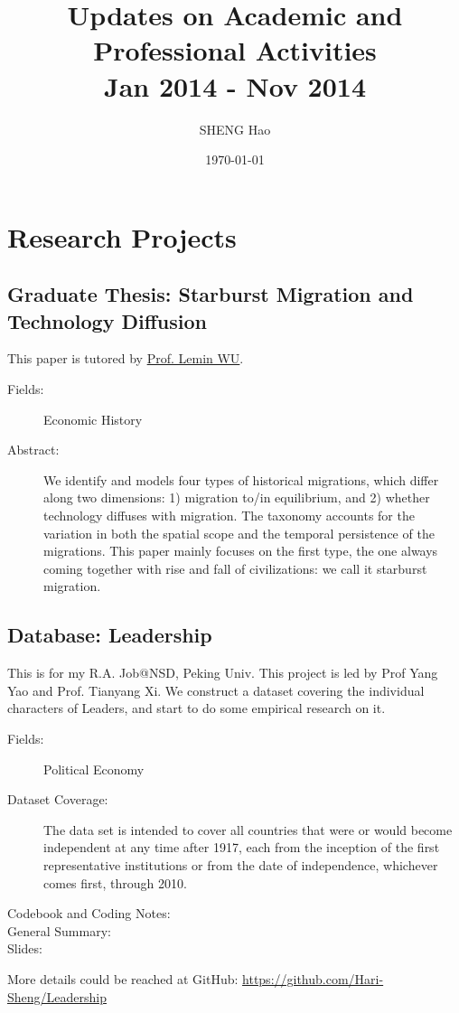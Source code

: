\documentclass{article}
\begin{document}
\title{Updates on Academic and Professional Activities\\Jan 2014 - Nov 2014}
\author{{\normalsize SHENG Hao}}
\date{\today}

\maketitle

\def \Pr{{\rm Pr}}
\baselineskip 0.6cm
\section{Research Projects}
\subsection{Graduate Thesis: Starburst Migration and Technology Diffusion}
This paper is tutored by \href{http://wulemin.weebly.com/index.html}{Prof. Lemin WU}. 
\begin{description}
\item[Fields:] Economic History
\item[Abstract:] We identify and models four types of historical migrations, which differ along two dimensions: 1) migration to/in equilibrium, and 2) whether technology diffuses with migration. 
The taxonomy accounts for the variation in both the spatial scope and the temporal persistence of the migrations. This paper mainly focuses on the first type, the one always coming together with rise and fall of civilizations: we call it starburst migration.

\end{description}

\subsection{Database: Leadership}
This is for my R.A. Job@NSD, Peking Univ. This project is led by Prof Yang Yao and Prof. Tianyang Xi. We construct a dataset covering the individual characters of Leaders, and start to do some empirical research on it.
\begin{description}
\item[Fields:] Political Economy
\item[Dataset Coverage:] The data set is intended to cover all countries that were or would become independent at any time after 1917, each from the inception of the first representative institutions or from the date of independence, whichever comes first, through 2010.
\item[Codebook and Coding Notes:]
\item[General Summary:]
\item[Slides:]
\end{description}
More details could be reached at GitHub: \url{https://github.com/Hari-Sheng/Leadership}
\end{document}
